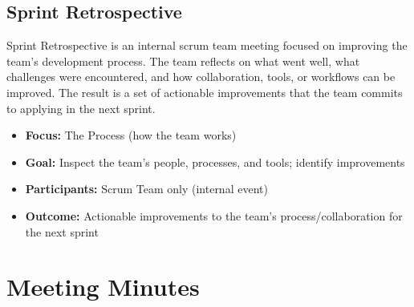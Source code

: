 \documentclass{article}
\begin{document}
\subsection{Sprint Retrospective}
Sprint Retrospective is an internal scrum team meeting focused on improving the team’s development process. The team reflects on what went well, what challenges were encountered, and how collaboration, tools, or workflows can be improved. The result is a set of actionable improvements that the team commits to applying in the next sprint.

\begin{itemize}
    \item \textbf{Focus:} The Process (how the team works)
    \item \textbf{Goal:} Inspect the team's people, processes, and tools; identify improvements
    \item \textbf{Participants:} Scrum Team only (internal event)
    \item \textbf{Outcome:} Actionable improvements to the team's process/collaboration for the next sprint
\end{itemize}
\section{Meeting Minutes}
\end{document}
